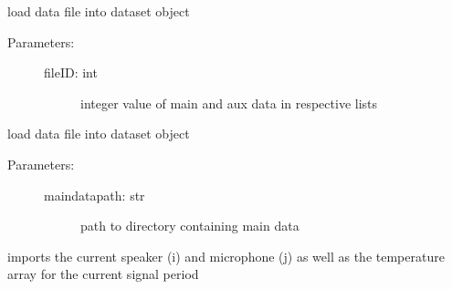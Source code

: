 \documentclass[letterpaper,10pt,english]{sphinxmanual}
\begin{document}
\begin{fulllineitems}
\begin{fulllineitems}
\begin{description}
\begin{description}
\end{description}

\end{description}

\end{fulllineitems}


\begin{fulllineitems}
\label{\detokenize{code:ATom.atom_functions.dataset.load_data_sample}}
load data file into dataset object
\begin{description}
\item[{Parameters:}] \leavevmode\begin{description}
\item[{fileID: int}] \leavevmode
integer value of main and aux data in respective lists

\end{description}

\end{description}

\end{fulllineitems}


\begin{fulllineitems}
\label{\detokenize{code:ATom.atom_functions.dataset.load_main}}
load data file into dataset object
\begin{description}
\item[{Parameters:}] \leavevmode\begin{description}
\item[{maindatapath: str}] \leavevmode
path to directory containing main data

\end{description}

\end{description}

\end{fulllineitems}


\begin{fulllineitems}
\label{\detokenize{code:ATom.atom_functions.dataset.signal_ETAs}}
imports the current speaker (i) and microphone (j) as well as the temperature
array for the current signal period


\end{fulllineitems}
\end{fulllineitems}
\end{document}
